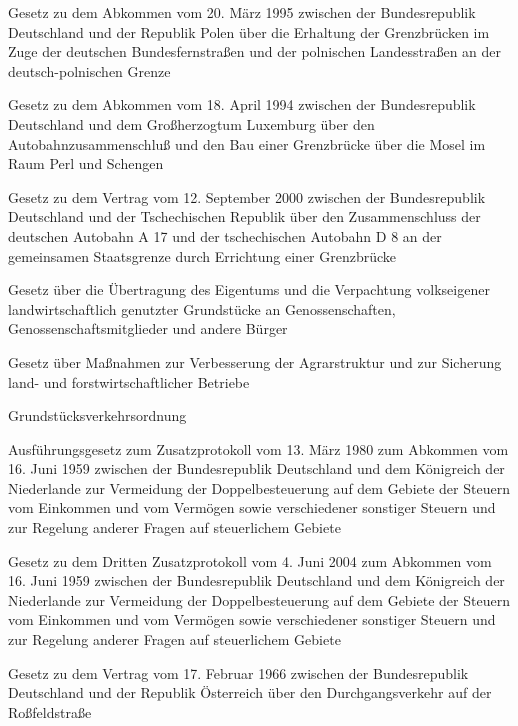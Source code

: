 \item[{GrBrückAbkPOLG}] Gesetz zu dem Abkommen vom 20. März 1995 zwischen der Bundesrepublik Deutschland und der Republik Polen über die Erhaltung der Grenzbrücken im Zuge der deutschen Bundesfernstraßen und der polnischen Landesstraßen an der deutsch-polnischen Grenze

\item[{GrBrückPerlAbkLUXG}] Gesetz zu dem Abkommen vom 18. April 1994 zwischen der Bundesrepublik Deutschland und dem Großherzogtum Luxemburg über den Autobahnzusammenschluß und den Bau einer Grenzbrücke über die Mosel im Raum Perl und Schengen

\item[{GrBrückVtr2000CZEG}] Gesetz zu dem Vertrag vom 12. September 2000 zwischen der Bundesrepublik Deutschland und der Tschechischen Republik über den Zusammenschluss der deutschen Autobahn A 17 und der tschechischen Autobahn D 8 an der gemeinsamen Staatsgrenze durch Errichtung einer Grenzbrücke

\item[{GrdstEÜVpG}] Gesetz über die Übertragung des Eigentums und die Verpachtung volkseigener landwirtschaftlich genutzter Grundstücke an Genossenschaften, Genossenschaftsmitglieder und andere Bürger

\item[{GrdstVG}] Gesetz über Maßnahmen zur Verbesserung der Agrarstruktur und zur Sicherung land- und forstwirtschaftlicher Betriebe

\item[{GrdstVV}] Grundstücksverkehrsordnung

\item[{GrenzgNLDAG}] Ausführungsgesetz zum Zusatzprotokoll vom 13. März 1980 zum Abkommen vom 16. Juni 1959 zwischen der Bundesrepublik Deutschland und dem Königreich der Niederlande zur Vermeidung der Doppelbesteuerung auf dem Gebiete der Steuern vom Einkommen und vom Vermögen sowie verschiedener sonstiger Steuern und zur Regelung anderer Fragen auf steuerlichem Gebiete

\item[{GrenzgNLDZusProt3G}] Gesetz zu dem Dritten Zusatzprotokoll vom 4. Juni 2004 zum Abkommen vom 16. Juni 1959 zwischen der Bundesrepublik Deutschland und dem Königreich der Niederlande zur Vermeidung der Doppelbesteuerung auf dem Gebiete der Steuern vom Einkommen und vom Vermögen sowie verschiedener sonstiger Steuern und zur Regelung anderer Fragen auf steuerlichem Gebiete

\item[{GrenzVerkAUTVtrG-1}] Gesetz zu dem Vertrag vom 17. Februar 1966 zwischen der Bundesrepublik Deutschland und der Republik Österreich über den Durchgangsverkehr auf der Roßfeldstraße

